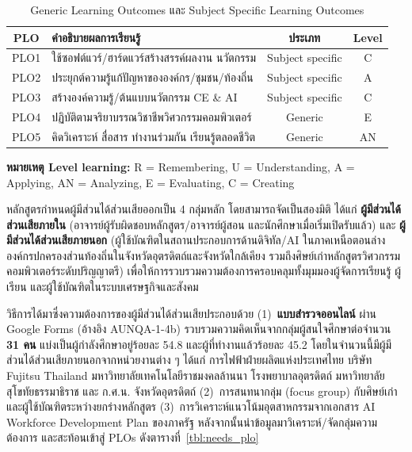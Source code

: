 \begin{table}[H]
  \centering
  \caption{Generic Learning Outcomes และ Subject Specific Learning Outcomes}
  \begin{tabularx}{\linewidth}{|c|Y|c|c|}
    \hline
    \textbf{PLO} & \textbf{คำอธิบายผลการเรียนรู้} & \textbf{ประเภท} & \textbf{Level} \\
    \hline
    PLO1 & ใช้ซอฟต์แวร์/ฮาร์ดแวร์สร้างสรรค์ผลงาน นวัตกรรม & Subject specific & C \\
    \hline
    PLO2 & ประยุกต์ความรู้แก้ปัญหาขององค์กร/ชุมชน/ท้องถิ่น & Subject specific & A \\
    \hline
    PLO3 & สร้างองค์ความรู้/ต้นแบบนวัตกรรม CE \& AI & Subject specific & C \\
    \hline
    PLO4 & ปฏิบัติตามจริยาบรรณวิชาชีพวิศวกรรมคอมพิวเตอร์ & Generic & E \\
    \hline
    PLO5 & คิดวิเคราะห์ สื่อสาร ทำงานร่วมกัน เรียนรู้ตลอดชีวิต & Generic & AN \\
    \hline
  \end{tabularx}
\end{table}

\noindent\textbf{หมายเหตุ Level learning:} R = Remembering, U = Understanding, A = Applying, AN = Analyzing, E = Evaluating, C = Creating


หลักสูตรกำหนดผู้มีส่วนได้ส่วนเสียออกเป็น 4 กลุ่มหลัก โดยสามารถจัดเป็นสองมิติ ได้แก่ \textbf{ผู้มีส่วนได้ส่วนเสียภายใน} (อาจารย์ผู้รับผิดชอบหลักสูตร/อาจารย์ผู้สอน และนักศึกษาเมื่อเริ่มเปิดรับแล้ว) และ \textbf{ผู้มีส่วนได้ส่วนเสียภายนอก} (ผู้ใช้บัณฑิตในสถานประกอบการด้านดิจิทัล/AI ในภาคเหนือตอนล่าง องค์กรปกครองส่วนท้องถิ่นในจังหวัดอุตรดิตถ์และจังหวัดใกล้เคียง รวมถึงศิษย์เก่าหลักสูตรวิศวกรรมคอมพิวเตอร์ระดับปริญญาตรี) เพื่อให้การรวบรวมความต้องการครอบคลุมทั้งมุมมองผู้จัดการเรียนรู้ ผู้เรียน และผู้ใช้บัณฑิตในระบบเศรษฐกิจและสังคม

วิธีการได้มาซึ่งความต้องการของผู้มีส่วนได้ส่วนเสียประกอบด้วย (1)~\textbf{แบบสำรวจออนไลน์} ผ่าน Google Forms (อ้างอิง AUNQA-1-4b) รวบรวมความคิดเห็นจากกลุ่มผู้สนใจศึกษาต่อจำนวน \textbf{31 คน} แบ่งเป็นผู้กำลังศึกษาอยู่ร้อยละ 54.8 และผู้ที่ทำงานแล้วร้อยละ 45.2 โดยในจำนวนนี้มีผู้มีส่วนได้ส่วนเสียภายนอกจากหน่วยงานต่าง ๆ ได้แก่ การไฟฟ้าฝ่ายผลิตแห่งประเทศไทย บริษัท Fujitsu Thailand มหาวิทยาลัยเทคโนโลยีราชมงคลล้านนา โรงพยาบาลอุตรดิตถ์ มหาวิทยาลัยสุโขทัยธรรมาธิราช และ ก.ศ.น. จังหวัดอุตรดิตถ์ (2)~การสนทนากลุ่ม (focus group) กับศิษย์เก่าและผู้ใช้บัณฑิตระหว่างยกร่างหลักสูตร (3)~การวิเคราะห์แนวโน้มอุตสาหกรรมจากเอกสาร AI Workforce Development Plan ของภาครัฐ หลังจากนั้นนำข้อมูลมาวิเคราะห์/จัดกลุ่มความต้องการ และสะท้อนเข้าสู่ PLOs ดังตารางที่~\ref{tbl:needs_plo}

